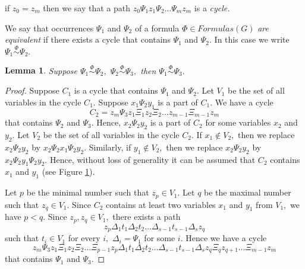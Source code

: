 \documentclass{au}
\theoremstyle{plain}
\newtheorem{lemma}{Lemma}
\theoremstyle{definition}
\theoremstyle{remark}
\numberwithin{equation}{section}
\begin{document}
if $z_{0}= z_{m}$ then we say that a path $z_{0}\Psi_{1}z_{1}\Psi_{2}\ldots \Psi_{m}z_{m}$
is a \emph{cycle.}

We say that occurrences $\Psi_{1}$ and $\Psi_{2}$
of a formula $\Phi\in Formulas(G)$
\emph{are equivalent} if there exists a cycle that contains
$\Psi_{1}$ and $\Psi_{2}.$
In this case we write $\Psi_{1}\overset{\Phi}\sim\Psi_{2}.$

\begin{lemma}

Suppose $\Psi_{1}\overset{\Phi}\sim \Psi_{2},$
$\Psi_{2}\overset{\Phi} \sim \Psi_{3},$
then $\Psi_{1}\overset{\Phi}\sim \Psi_{3}.$

\end{lemma}

\begin{proof}

Suppose $C_{1}$ is a cycle that contains $\Psi_{1}$ and $\Psi_{2}.$
Let $V_{1}$ be the set of all variables in the cycle $C_{1}.$
Suppose $x_{1}\Psi_{2}y_{1}$ is a part of $C_{1}.$
We have a cycle $$C_{2} = z_{m}\Psi_{3}z_{1}\Xi_{1}z_{2}\Xi_{2}\ldots z_{m-1}\Xi_{m-1}z_{m}$$
that contains $\Psi_{2}$ and $\Psi_{3}.$
Hence, $x_{2}\Psi_{2}y_{2}$ is a part of $C_{2}$ for some variables $x_{2}$ and $y_{2}.$
Let $V_{2}$ be the set of all variables in the cycle $C_{2}.$
If $x_{1}\notin V_{2},$
then we replace
$x_{2}\Psi_{2}y_{2}$
by $x_{2}\Psi_{2}x_{1}\Psi_{2}y_{2}.$
Similarly, if $y_{1}\notin V_{2},$
then we replace
$x_{2}\Psi_{2}y_{2}$
by $x_{2}\Psi_{2}y_{1}\Psi_{2}y_{2}.$
Hence, without loss of generality it can be assumed that
$C_{2}$ contains $x_{1}$ and $y_{1}$ (see Figure \ref{threecycles}).

Let $p$ be the minimal number such that $z_{p}\in V_{1}.$
Let $q$ be the maximal number such that $z_{q}\in V_{1}.$
Since $C_{2}$ contains at least two variables $x_{1}$ and $y_{1}$ from $V_{1},$
we have $p<q.$
Since $z_{p},z_{q}\in V_{1},$
there exists a path
$$z_{p}\Delta_{1}t_{1}\Delta_{2}t_{2}\ldots \Delta_{s-1}t_{s-1}\Delta_{s}z_{q}$$
such that $t_{i}\in V_{1}$ for every $i,$
$\Delta_{i} = \Psi_{1}$ for some $i.$
Hence we have a cycle
$$
z_{m}\Psi_{3}z_{1}\Xi_{1}z_{2}\Xi_{2}\ldots \Xi_{p-1}z_{p}
\Delta_{1}t_{1}\Delta_{2}t_{2}\ldots \Delta_{s-1}t_{s-1}\Delta_{s}z_{q}
\Xi_{q}z_{q+1}\ldots \Xi_{m-1}z_{m}
$$
that contains $\Psi_{1}$ and $\Psi_{3}.$

\end{proof}

\begin{figure}
\centerline{
}
\caption{}\label{threecycles}
\end{figure}
\end{document}
